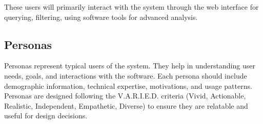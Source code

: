 \documentclass[12pt]{article}
\begin{document}
These users will primarily interact with the system through the web interface for querying, filtering, using software tools for advanced analysis. 


\subsection{Personas}

Personas represent typical users of the system. They help in understanding user needs, goals, and interactions with the software. Each persona should include demographic information, technical expertise, motivations, and usage patterns. Personas are designed following the V.A.R.I.E.D. criteria (Vivid, Actionable, Realistic, Independent, Empathetic, Diverse) to ensure they are relatable and useful for design decisions.
\end{document}
